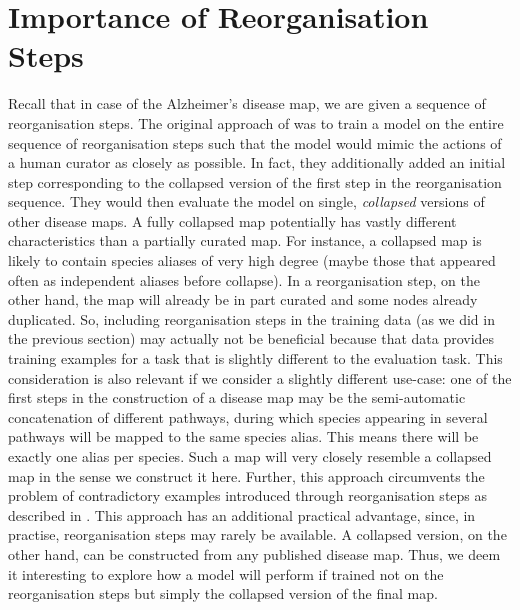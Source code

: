 \documentclass[
	fontsize=10pt, %
	twoside=true, %
	secnumdepth=1, %
  toc=indentunnumbered %
]{kaobook}
\begin{document}
\section{Importance of Reorganisation Steps}
\label{sec:importance-reorganisation-steps}
Recall that in case of the Alzheimer's disease map, we are
given a sequence of reorganisation steps. The original approach of \nielsen{}
was to
train a model on the entire sequence of reorganisation steps such that the model
would mimic the actions of a human curator as closely as possible. In fact, they
additionally added an initial step corresponding to the collapsed version of the
first step in the reorganisation sequence. They would
then evaluate the model on single, \textit{collapsed} versions of other disease maps.
%
A fully collapsed map potentially has vastly different characteristics than a
partially curated map. For instance, a collapsed map is likely to contain
species aliases of very high degree (maybe those that appeared often as
independent aliases before collapse). In a reorganisation step, on the other
hand, the map will already be in part curated and some nodes already duplicated.
%
So, including reorganisation steps in the training data (as we did in the
previous section) may actually not be beneficial because that data provides
training examples for a task that is slightly different to the evaluation task.
%
This consideration is also relevant if we consider a slightly different
use-case: one of the first steps in the construction of a disease map may be the
semi-automatic concatenation of different pathways, during which species
appearing in several pathways will be mapped to the same species alias. This
means there will be exactly one alias per species. Such a map will very closely
resemble a collapsed map in the sense we construct it here.
%
%
Further, this approach circumvents the problem of contradictory examples introduced
through reorganisation steps as described in .
%
This approach has an additional practical advantage, since, in practise,
reorganisation steps may rarely be available. A collapsed version, on the
other hand, can be constructed from any published disease map.
%
Thus, we deem it interesting to explore how a model will perform if trained not
on the reorganisation steps but simply the collapsed version of the final map.
%
\end{document}
